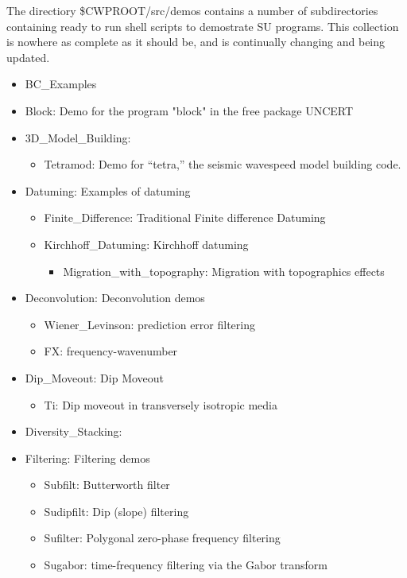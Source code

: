 The directiory \$CWPROOT/src/demos   contains a number of subdirectories containing
ready to run shell scripts to demostrate SU programs. This collection is nowhere
as complete as it should be, and is continually changing and being updated.

\begin{itemize}
\item BC\_Examples
\item Block:  Demo for the program "block" in the free package UNCERT
\item 3D\_Model\_Building:
	\begin{itemize}
	\item Tetramod:  Demo for ``tetra,'' the seismic wavespeed model building code.
	\end{itemize}
\item Datuming: Examples of datuming
	\begin{itemize}
	\item Finite\_Difference:   Traditional Finite difference Datuming
	\item Kirchhoff\_Datuming:   Kirchhoff datuming
		\begin{itemize}
		\item Migration\_with\_topography:  Migration with topographics effects
		\end{itemize}
	\end{itemize}
\item Deconvolution:  Deconvolution demos
	\begin{itemize}
	\item Wiener\_Levinson:  prediction error filtering 
	\item FX:   frequency-wavenumber
	\end{itemize}
\item Dip\_Moveout:   Dip Moveout
	\begin{itemize}
	\item Ti:   Dip moveout in transversely isotropic media
	\end{itemize}
\item Diversity\_Stacking:
\item Filtering:   Filtering demos
	\begin{itemize}
	\item Subfilt:  Butterworth filter
	\item Sudipfilt:  Dip (slope) filtering
	\item Sufilter: Polygonal zero-phase frequency filtering
	\item Sugabor: time-frequency filtering via the Gabor transform

\end{itemize}
\end{itemize}

